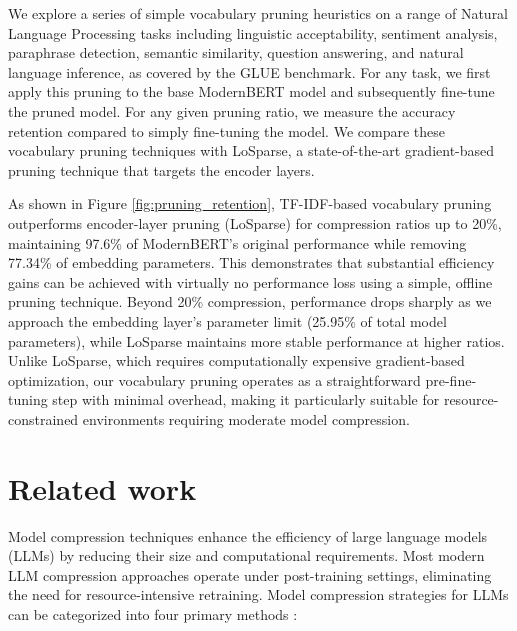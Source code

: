 \documentclass[twocolumn]{article}
\begin{document}
We explore a series of simple vocabulary pruning heuristics on a range of Natural Language Processing tasks including linguistic acceptability, sentiment analysis, paraphrase detection, semantic similarity, question answering, and natural language inference, as covered by the GLUE benchmark. For any task, we first apply this pruning to the base ModernBERT model and subsequently fine-tune the pruned model. For any given pruning ratio, we measure the accuracy retention compared to simply fine-tuning the model. We compare these vocabulary pruning techniques with LoSparse, a state-of-the-art gradient-based pruning technique that targets the encoder layers.

As shown in Figure \ref{fig:pruning_retention}, TF-IDF-based vocabulary pruning outperforms encoder-layer pruning (LoSparse) for compression ratios up to 20\%, maintaining 97.6\% of ModernBERT's original performance while removing 77.34\% of embedding parameters. This demonstrates that substantial efficiency gains can be achieved with virtually no performance loss using a simple, offline pruning technique. Beyond 20\% compression, performance drops sharply as we approach the embedding layer's parameter limit (25.95\% of total model parameters), while LoSparse maintains more stable performance at higher ratios. Unlike LoSparse, which requires computationally expensive gradient-based optimization, our vocabulary pruning operates as a straightforward pre-fine-tuning step with minimal overhead, making it particularly suitable for resource-constrained environments requiring moderate model compression.

\section{Related work}
Model compression techniques enhance the efficiency of large language models (LLMs) by reducing their size and computational requirements. Most modern LLM compression approaches operate under post-training settings, eliminating the need for resource-intensive retraining.
Model compression strategies for LLMs can be categorized into four primary methods \cite{wan2023efficient}:
\end{document}

